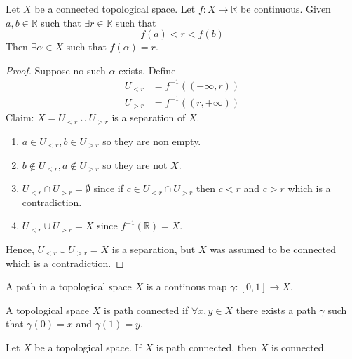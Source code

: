 \begin{theorem}
  Let \( X \) be a connected topological space.
  Let \( f: X \to \mathbb{R} \) be continuous.
  Given \( a, b \in \mathbb{R} \) such that \( \exists r\in \mathbb{R} \)
  such that \[ f(a) < r < f(b) \]
  Then \( \exists \alpha \in X \) such that \( f(\alpha) = r \).
\end{theorem}

\begin{proof}
   Suppose no such \( \alpha \) exists.
   Define
   \begin{align}
     U_{< r} &= {f}^{-1} \left((-\infty, r)\right) \\
     U_{> r} &= {f}^{-1} \left((r, +\infty)\right)
   \end{align}
   Claim: \( X = U_{<r} \cup U_{>r} \) is a separation
   of \( X \).
    \begin{enumerate}
        \item
          \( a \in U_{<r}, b \in U_{>r} \) so
          they are non empty.
        \item
          \( b \not\in U_{<r}, a \not\in U_{>r} \)
          so they are not \( X \).
        \item
          \( U_{<r} \cap U_{>r} = \emptyset \)
          since if \( c \in U_{<r} \cap U_{>r} \) then
          \( c < r \) and \( c > r \) which is a contradiction.
        \item
          \( U_{<r} \cup U_{>r} = X\)
          since \( {f}^{-1} (\mathbb{R}) = X \).
    \end{enumerate}
   Hence, \( U_{<r} \cup U_{>r} = X \) is a separation, but
   \( X \) was assumed to be connected which is a contradiction.
\end{proof}

\begin{definition}[path]
   A path in a topological space \( X \)
   is a continous map \( \gamma: [0, 1] \to X \).
\end{definition}

\begin{definition}
   A topological space \( X \) is path connected
   if \( \forall x, y \in X \) there exists a path
   \( \gamma \) such that \( \gamma(0) = x \) and \( \gamma(1) = y \).
\end{definition}

\begin{proposition}
    Let \( X \) be a topological space.
    If \( X \) is path connected, then \( X \) is connected.
\end{proposition}

